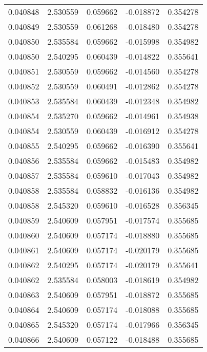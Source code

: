 \begin{tabular}{lrrrr}
0.040848    &  2.530559 &  0.059662 & -0.018872 &             0.354278 \\
0.040849    &  2.530559 &  0.061268 & -0.018480 &             0.354278 \\
0.040850    &  2.535584 &  0.059662 & -0.015998 &             0.354982 \\
0.040850    &  2.540295 &  0.060439 & -0.014822 &             0.355641 \\
0.040851    &  2.530559 &  0.059662 & -0.014560 &             0.354278 \\
0.040852    &  2.530559 &  0.060491 & -0.012862 &             0.354278 \\
0.040853    &  2.535584 &  0.060439 & -0.012348 &             0.354982 \\
0.040854    &  2.535270 &  0.059662 & -0.014961 &             0.354938 \\
0.040854    &  2.530559 &  0.060439 & -0.016912 &             0.354278 \\
0.040855    &  2.540295 &  0.059662 & -0.016390 &             0.355641 \\
0.040856    &  2.535584 &  0.059662 & -0.015483 &             0.354982 \\
0.040857    &  2.535584 &  0.059610 & -0.017043 &             0.354982 \\
0.040858    &  2.535584 &  0.058832 & -0.016136 &             0.354982 \\
0.040858    &  2.545320 &  0.059610 & -0.016528 &             0.356345 \\
0.040859    &  2.540609 &  0.057951 & -0.017574 &             0.355685 \\
0.040860    &  2.540609 &  0.057174 & -0.018880 &             0.355685 \\
0.040861    &  2.540609 &  0.057174 & -0.020179 &             0.355685 \\
0.040862    &  2.540295 &  0.057174 & -0.020179 &             0.355641 \\
0.040862    &  2.535584 &  0.058003 & -0.018619 &             0.354982 \\
0.040863    &  2.540609 &  0.057951 & -0.018872 &             0.355685 \\
0.040864    &  2.540609 &  0.057174 & -0.018088 &             0.355685 \\
0.040865    &  2.545320 &  0.057174 & -0.017966 &             0.356345 \\
0.040866    &  2.540609 &  0.057122 & -0.018488 &             0.355685 \\

\end{tabular}
